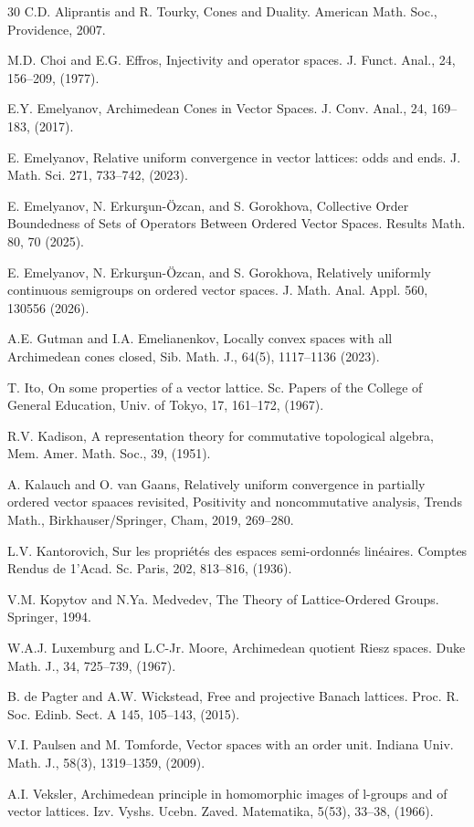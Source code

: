 \documentclass[10pt]{article}
\begin{document}
{\small
\begin{thebibliography}{30}
C.D. Aliprantis and R. Tourky, 
Cones and Duality. 
American Math. Soc., Providence, 2007.

M.D. Choi and E.G. Effros,
Injectivity and operator spaces.
J. Funct. Anal., 24, 156--209, (1977).

E.Y. Emelyanov, 
Archimedean Cones in Vector Spaces.
J. Conv. Anal., 24, 169--183, (2017).

E. Emelyanov,
Relative uniform convergence in vector lattices: odds and ends.
J. Math. Sci. 271, 733--742, (2023).

E. Emelyanov, N. Erkurşun-\"{O}zcan, and S. Gorokhova, 
Collective Order Boundedness of Sets of Operators Between Ordered Vector Spaces. 
Results Math. 80, 70 (2025).

E. Emelyanov, N. Erkurşun-\"{O}zcan, and S. Gorokhova, 
Relatively uniformly continuous semigroups on ordered vector spaces.
J. Math. Anal. Appl. 560, 130556 (2026).

A.E. Gutman and I.A. Emelianenkov,
Locally convex spaces with all Archimedean cones closed,
Sib. Math. J., 64(5), 1117--1136 (2023).

T. Ito,
On some properties of a vector lattice.
Sc. Papers of the College of General Education, Univ. of Tokyo, 17, 161--172, (1967).

R.V. Kadison,
A representation theory for commutative topological algebra,
Mem. Amer. Math. Soc., 39, (1951).

A. Kalauch and O. van Gaans, 
Relatively uniform convergence in partially ordered vector spaaces revisited, 
Positivity and noncommutative analysis, 
Trends Math., Birkhauser/Springer, Cham, 2019, 269--280.

L.V. Kantorovich,
Sur les propriétés des espaces semi-ordonnés linéaires.
Comptes Rendus de 1'Acad. Sc. Paris, 202, 813--816, (1936).

V.M. Kopytov and N.Ya. Medvedev,
The Theory of Lattice-Ordered Groups.
Springer, 1994.

W.A.J. Luxemburg and L.C-Jr. Moore, 
Archimedean quotient Riesz spaces.
Duke Math. J., 34, 725--739, (1967).

B. de Pagter and A.W. Wickstead,
Free and projective Banach lattices. 
Proc. R. Soc. Edinb. Sect. A 145, 105--143, (2015).

V.I. Paulsen and M. Tomforde,
Vector spaces with an order unit.
Indiana Univ. Math. J., 58(3), 1319--1359, (2009).

A.I. Veksler,
Archimedean principle in homomorphic images of l-groups and of vector lattices. 
Izv. Vyshs. Ucebn. Zaved. Matematika, 5(53), 33--38, (1966). 
\end{thebibliography}}
\end{document}
